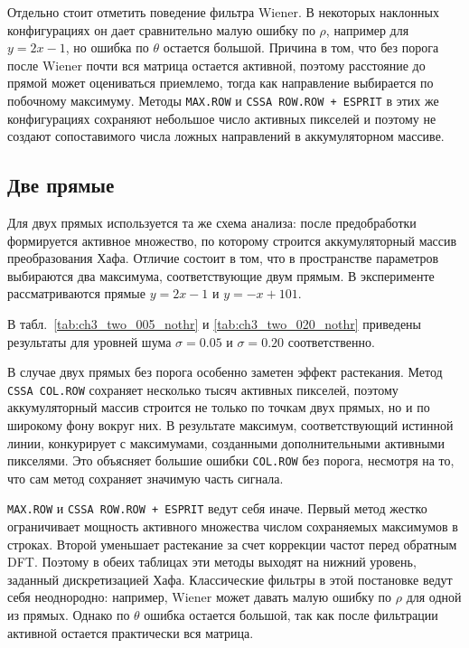 Отдельно стоит отметить поведение фильтра Wiener. В некоторых наклонных
конфигурациях он дает сравнительно малую ошибку по $\rho$, например для
$y=2x-1$, но ошибка по $\theta$ остается большой. Причина в том, что без
порога после Wiener почти вся матрица остается активной, поэтому расстояние до
прямой может оцениваться приемлемо, тогда как направление выбирается по
побочному максимуму. Методы \texttt{MAX.ROW} и
\texttt{CSSA ROW.ROW + ESPRIT} в этих же конфигурациях сохраняют небольшое
число активных пикселей и поэтому не создают сопоставимого числа ложных
направлений в аккумуляторном массиве.

\subsection{Две прямые}

Для двух прямых используется та же схема анализа: после предобработки
формируется активное множество, по которому строится аккумуляторный массив
преобразования Хафа. Отличие состоит в том, что в пространстве параметров
выбираются два максимума, соответствующие двум прямым. В эксперименте
рассматриваются прямые $y=2x-1$ и $y=-x+101$.

В табл.~\ref{tab:ch3_two_005_nothr} и
\ref{tab:ch3_two_020_nothr} приведены результаты для уровней шума
$\sigma=0.05$ и $\sigma=0.20$ соответственно.





В случае двух прямых без порога особенно заметен эффект растекания. Метод
\texttt{CSSA COL.ROW} сохраняет несколько тысяч активных пикселей, поэтому
аккумуляторный массив строится не только по точкам двух прямых, но и по
широкому фону вокруг них. В результате максимум, соответствующий истинной
линии, конкурирует с максимумами, созданными дополнительными активными
пикселями. Это объясняет большие ошибки \texttt{COL.ROW} без порога, несмотря
на то, что сам метод сохраняет значимую часть сигнала.

\texttt{MAX.ROW} и \texttt{CSSA ROW.ROW + ESPRIT} ведут себя иначе. Первый
метод жестко ограничивает мощность активного множества числом сохраняемых
максимумов в строках. Второй уменьшает растекание за счет коррекции частот
перед обратным DFT. Поэтому в обеих таблицах эти методы выходят на нижний
уровень, заданный дискретизацией Хафа. Классические фильтры в этой постановке
ведут себя неоднородно: например, Wiener может давать малую ошибку по
$\rho$ для одной из прямых. Однако по $\theta$ ошибка остается большой, так как
после фильтрации активной остается практически вся матрица.


